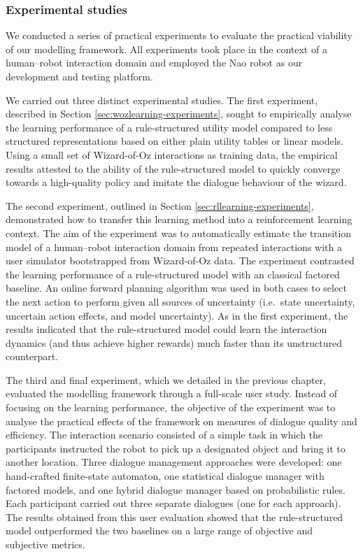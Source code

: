 \subsubsection*{Experimental studies}

We conducted a series of practical experiments to evaluate the practical viability of our modelling framework. All experiments took place in the context of a human--robot interaction domain and employed the Nao robot as our development and testing platform. 

We carried out three distinct experimental studies.  The first experiment, described in Section \ref{sec:wozlearning-experiments}, sought to empirically analyse the learning performance of a rule-structured utility model compared to less structured representations based on either plain utility tables or linear models.  Using a small set of Wizard-of-Oz interactions as training data, the empirical results attested to the ability of the rule-structured model to quickly converge towards a high-quality policy and imitate the dialogue behaviour of the wizard.

The second experiment, outlined in Section \ref{sec:rllearning-experiments}, demonstrated how to transfer this learning method into a reinforcement learning context.  The aim of the experiment was to automatically estimate the transition model of a human--robot interaction domain from repeated interactions with a user simulator bootstrapped from Wizard-of-Oz data. The experiment contrasted the learning performance of a rule-structured model with an classical factored baseline.  An online forward planning algorithm was used in both cases to select the next action to perform given all sources of uncertainty (i.e.\ state uncertainty, uncertain action effects, and model uncertainty). As in the first experiment, the results indicated that the rule-structured model could learn the interaction dynamics (and thus achieve higher rewards) much faster than its unstructured counterpart.

The third and final experiment, which we detailed in the previous chapter, evaluated the modelling framework through a full-scale user study.   Instead of focusing on the learning performance, the objective of the experiment was to analyse the practical effects of the framework on measures of dialogue quality and efficiency. The interaction scenario consisted of a simple task in which the participants instructed the robot to pick up a designated object and bring it to another location. Three dialogue management approaches were developed: one hand-crafted finite-state automaton, one statistical dialogue manager with factored models, and one hybrid dialogue manager based on probabilistic rules.  Each participant carried out three separate dialogues (one for each approach).  The results obtained from this user evaluation showed that the rule-structured model outperformed the two baselines on a large range of objective and subjective metrics.

